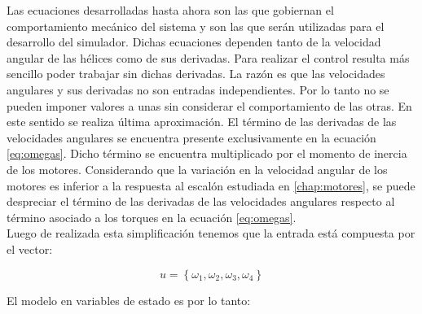\documentclass[main]{subfiles}
\begin{document}
Las ecuaciones desarrolladas hasta ahora son las que gobiernan el comportamiento mecánico del sistema y son las que serán utilizadas para el desarrollo del simulador. Dichas ecuaciones dependen tanto de la velocidad angular de las hélices como de sus derivadas. Para realizar el control resulta m\'as sencillo poder trabajar sin dichas derivadas. La raz\'on es que las velocidades angulares y sus derivadas no son entradas independientes. Por lo tanto no se pueden imponer valores a unas sin considerar el comportamiento de las otras. En este sentido se realiza \'ultima aproximaci\'on. El t\'ermino de las derivadas de las velocidades angulares se encuentra presente exclusivamente en la ecuaci\'on \ref{eq:omegas}. Dicho t\'ermino se encuentra multiplicado por el momento de inercia de los motores. Considerando que la variaci\'on en la velocidad angular de los motores es inferior a la respuesta al escal\'on estudiada en \ref{chap:motores}, se puede despreciar el t\'ermino de las derivadas de las velocidades angulares respecto al t\'ermino asociado a los torques en la ecuaci\'on \ref{eq:omegas}.\\

Luego de realizada esta simplificaci\'on tenemos que la entrada est\'a compuesta por el vector:

$$u=\left\lbrace\omega_1, \omega_2, \omega_3, \omega_4\right\rbrace$$

El modelo en variables de estado es por lo tanto:
\end{document}
